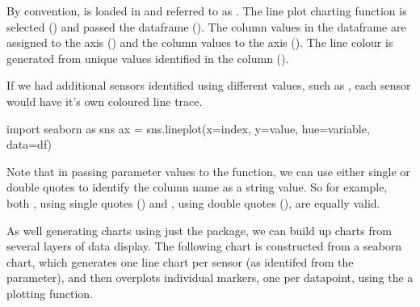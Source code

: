 \documentclass[letterpaper,10pt,english]{sphinxmanual}
\begin{document}
By convention,  is loaded in and referred to as . The line plot charting function is selected () and passed the dataframe (). The  column values in the dataframe are assigned to the \sphinxhyphen{}axis () and the  column values to the \sphinxhyphen{}axis (). The line colour is generated from unique values identified in the  column ().

If we had additional sensors identified using different  values, such as , each sensor would have it’s own coloured line trace.

{
\begin{sphinxVerbatim}[commandchars=\\\{\}]
\llap{\color{nbsphinxin}[ ]:\,\hspace{\fboxrule}\hspace{\fboxsep}}import seaborn as sns
ax = sns.lineplot(x=\PYGZdq{}index\PYGZdq{}, y=\PYGZdq{}value\PYGZdq{}, hue=\PYGZsq{}variable\PYGZsq{}, data=df)
\end{sphinxVerbatim}
}

Note that in passing parameter values to the  function, we can use either single or double quotes to identify the column name as a string value. So for example, both , using single quotes (\sphinxcode{\sphinxupquote{\textquotesingle{}}}) and , using double quotes (), are equally valid.

As well generating charts using just the  package, we can build up charts from several layers of data display. The following chart is constructed from a seaborn  chart, which generates one line chart per sensor (as identifed from the  parameter), and then overplots individual  markers, one per datapoint, using the a  plotting function.
\end{document}
